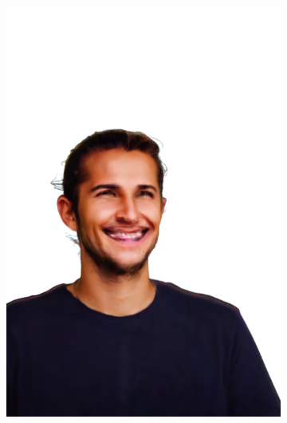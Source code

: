 \begin{figure}[ht]
\begin{subfigure}{0.08\linewidth}
        \includegraphics[width=\textwidth]{Figures/results/high/ephra_smile/11_render.png}

\end{subfigure}
\end{figure}

